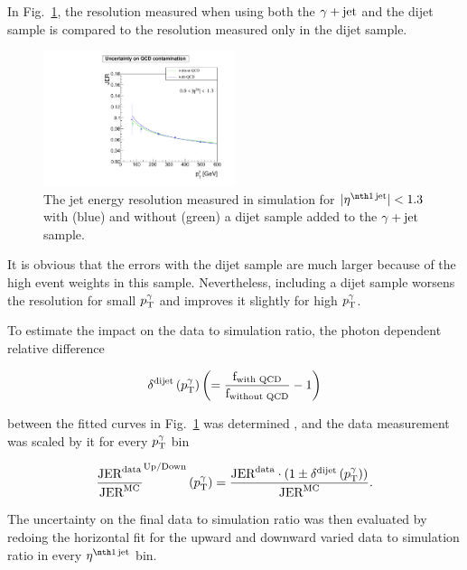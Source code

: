 In \mbox{Fig. \ref{fig:QCDuncertainty}}, the resolution measured when using both the $\gamma + \text{jet}$ and the dijet sample is compared to the resolution measured only in the dijet sample.
\begin{figure}[b]
  \centering

      \includegraphics[width=0.50\textwidth]{figures/resolution/systematicUncertainties/Resolution_for_1_eta_bin_QCDUncertainty_RMS99.pdf}
 
  \caption{The jet energy resolution measured in simulation for $|\etafirstjet| < 1.3$ with (blue) and without (green) a dijet sample added to the $\gamma + \text{jet}$ sample.}  
  \label{fig:QCDuncertainty}
\end{figure}
It is obvious that the errors with the dijet sample are much larger because of the high event weights in this sample. 
Nevertheless, including a dijet sample worsens the resolution for small $p_{\text{T}}^{\gamma}$ and improves it slightly for high $p_{\text{T}}^{\gamma}$.

To estimate the impact on the data to simulation ratio, 
the photon \pt dependent  relative difference 

\begin{equation}
\label{eq:dijetUnc1}
\delta^{\text{dijet}} \left( p_{\text{T}}^{\gamma} \right) \left(= \frac{\text{f}_{\text{with QCD}}}{\text{f}_{\text{without QCD}}} - 1 \right)
\end{equation}
 
between the fitted curves in \mbox{Fig. \ref{fig:QCDuncertainty}}
was determined  , and the data measurement was scaled by it for every $p_{\text{T}}^{\gamma}$ bin 

\begin{equation}
\label{eq:dijetUnc}
\frac{\text{JER}^{\text{data}}}{\text{JER}^{\text{MC}}}^{\text{Up/Down}} \left( p_{\text{T}}^{\gamma}   \right) = \frac{\text{JER}^{\text{data}} 
\cdot (1 \pm \delta^{\text{dijet}}\left( p_{\text{T}}^{\gamma} \right))}{\text{JER}^{\text{MC}}}. 
\end{equation}

The uncertainty on the final data to simulation ratio was then evaluated by redoing the horizontal fit for the upward and downward varied data to simulation ratio 
in every $\etafirstjet$ bin.

